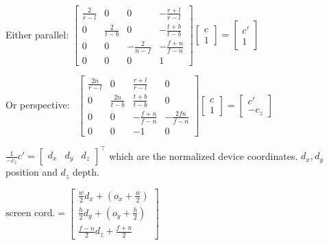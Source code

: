 \begin{definition}[Projection]
  \ \\
  Either parallel:
  \(\begin{bmatrix}
    \frac{2}{r -l} & 0 & 0 & - \frac{r + l}{r - l} \\
    0 & \frac{2}{t - b} & 0 & - \frac{t + b}{t - b} \\
    0 & 0 & - \frac{2}{n - f} & - \frac{f + n}{f - n} \\
    0 & 0 & 0 & 1
  \end{bmatrix} \begin{bmatrix}
    c \\ 1
  \end{bmatrix} = \begin{bmatrix}
    c' \\ 1
  \end{bmatrix}\)

  Or perspective:
  \
  \(\begin{bmatrix}
    \frac{2n}{r - l} & 0 & \frac{r + l}{r - l} & 0 \\
    0 & \frac{2n}{t - b} & \frac{t + b}{t - b} & 0 \\
    0 & 0 & - \frac{f + n}{f - n} & - \frac{2 f n}{f - n} \\
    0 & 0 & -1 & 0
  \end{bmatrix} \begin{bmatrix}
    c \\ 1
  \end{bmatrix} = \begin{bmatrix}
    c' \\ -c_z
  \end{bmatrix}\)
\end{definition}

\begin{definition}
  \(\frac{1}{- c_z}c' = \begin{bmatrix}
      d_x & d_y & d_z
  \end{bmatrix}^\top\)
  which are the normalized device coordinates. \(d_x, d_y\) position and \(d_z\) depth.
\end{definition}

\begin{definition}
  \(\text{screen cord.} = \begin{bmatrix}
    \frac{w}{2}d_x + (o_x  + \frac{w}{2}) \\
    \frac{h}{2}d_y + (o_y + \frac{h}{2}) \\
    \frac{f - n}{2}d_z + \frac{f + n}{2}
  \end{bmatrix}\)
\end{definition}
